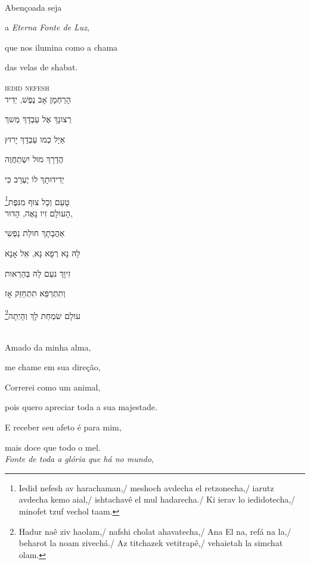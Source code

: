 \movetooddpage
\raggedright

\textsc{}\\[15pt]

Abençoada seja

a \emph{Eterna Fonte de Luz}, 

que nos ilumina como a chama

das velas de shabat. 


\movetoevenpage
\raggedleft

\textsc{iedid nefesh}\\[15pt]

הָרַחְמָן אָב נֶפֶשׁ, יְדִיד 

רְצונָךְ אֶל עַבְדָךְ מְשךְ 

אַיָל כְמו עַבְדָךְ יָרוּץ 

הֲדָרָךְ מוּל יִשְתַחֲוֶה 

יְדִידוּתָךְ לוֹ יֶעְרַב כִּי 

טָעַם וְכָל צוּף מִנּפֶת\footnote{Iedid nefesh av harachaman,/ meshoch avdecha el retzonecha,/ iarutz avdecha kemo aial,/ ishtachavê el mul hadarecha./ Ki ierav lo iedidotecha,/ minofet tzuf vechol taam.}\\[10pt]

הָעולָם זִיו נָאֶה, הָדוּר,

אַהֲבָתָךְ חולַת נַפְשִי 

לָהּ נָא רְפָא נָא, אֵל אָנָא 

זִיוָךְ נעַם לָהּ בְּהַרְאות

וְתִתְרַפֵּא תִתְחֵזֵּק אָז

עולָם שִׂמְחַת לָךְ וְהָיְתָה\footnote{Hadur naê ziv haolam,/ nafshi cholat ahavatecha,/ Ana El na, refá na la,/ beharot la noam zivechá./ Az titchazek vetitrapê,/ vehaietah la simchat olam.}\\[10pt]


\movetooddpage
\raggedright

\textbf{}\\[15pt]

Amado da minha alma,

me chame em sua direção,

Correrei como um animal,

pois quero apreciar toda a sua majestade.

E receber seu afeto é para mim,

mais doce que todo o mel.\\[10pt]

\emph{Fonte de toda a glória que há no mundo},

